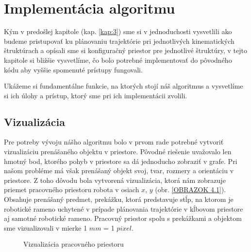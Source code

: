\section{Implementácia algoritmu}
\label{kap:4}

Kým v predošlej kapitole (kap. \ref{kap:3}) sme si v jednoduchosti vysvetlili ako budeme pristupovať ku plánovaniu trajektórie pri jednotlivých kinematických štruktúrach a opísali sme si konfiguračný priestor pre jednotlivé štruktúry, v tejto kapitole si bližšie vysvetlíme, čo bolo potrebné implementovať do pôvodného kódu aby vyššie spomenuté prístupy fungovali.

Ukážeme si fundamentálne funkcie, na ktorých stojí náš algoritmus a vysvetlíme si ich úlohy a prístup, ktorý sme pri ich implementácii zvolili.
 



\subsection{Vizualizácia}

Pre potreby vývoju nášho algoritmu bolo v prvom rade potrebné vytvoriť vizualizáciu prenášaného objektu v priestore. Pôvodné riešenie uvažovalo len hmotný bod, ktorého pohyb v priestore sa dá jednoducho zobraziť v grafe. Pri našom probléme má však prenášaný objekt svoj, tvar, rozmery a orientáciu v priestore. Z toho dôvodu bola vytvorená vizualizácia, ktorá nám zobrazuje priemet pracovného priestoru robota v osiach $ x $, $ y $ (obr. \ref{OBRAZOK 4.1}). Obsahuje prenášaný predmet, prekážku, ktorá predstavuje stĺp, na ktorom je robotické rameno uchytené  v prípade plánovania trajektórie v kĺbovom priestore aj samotné robotické rameno. Pracovný priestor spolu s prekážkami a objektom sme vizualizovali v mierke  1 $mm$ = 1 $pixel$. 

\begin{figure}[h]
	\centering
	\caption{Vizualizácia pracovného priestoru} \label{OBRAZOK 4.1} 
	\label{fig:border}
\end{figure} 

